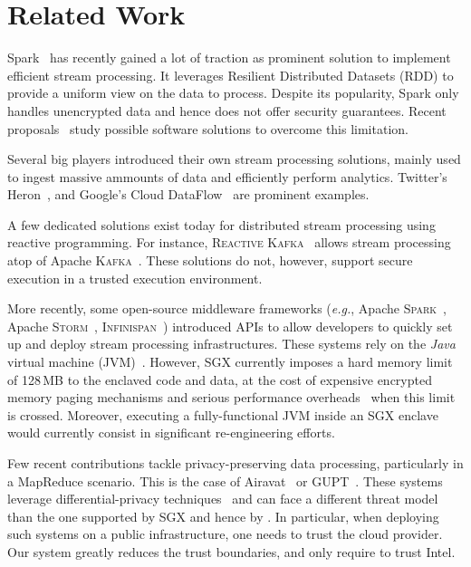 \section{Related Work}\label{sec:rw}


Spark~\cite{Zaharia:2013:DSF:2517349.2522737} has recently gained a lot of traction as prominent solution to implement efficient stream processing. 
It leverages Resilient Distributed Datasets (RDD) to provide a uniform view on the data to process.
Despite its popularity, Spark only handles unencrypted data and hence does not offer security guarantees. 
Recent proposals~\cite{7840754} study possible software solutions to overcome this limitation. 

Several big players introduced their own stream processing solutions, mainly used to ingest massive ammounts of data and efficiently perform analytics. 
Twitter's Heron~\cite{Kulkarni:2015:THS:2723372.2742788}, and Google's Cloud DataFlow~\cite{Akidau:2015:DMP:2824032.2824076} are prominent examples.

A few dedicated solutions exist today for distributed stream processing using reactive programming.
For instance, \textsc{Reactive Kafka}~\cite{reactivekafka} allows stream processing atop of Apache \textsc{Kafka}~\cite{apachekafka}.
These solutions do not, however, support secure execution in a trusted execution environment.

More recently, some open-source middleware frameworks (\emph{e.g.}, Apache \textsc{Spark}~\cite{apachesparkstreaming}, Apache \textsc{Storm}~\cite{apachestorm}, \textsc{Infinispan}~\cite{infinispan}) introduced APIs to allow developers to quickly set up and deploy stream processing infrastructures.
These systems rely on the \emph{Java} virtual machine (JVM)~\cite{lindholm2014java}.
However, SGX currently imposes a hard memory limit of 128\,MB to the enclaved code and data, at the cost of expensive encrypted memory paging mechanisms and serious performance overheads~\cite{pires_scbr:2016,brenner_securekeeper:_2016} when this limit is crossed.
Moreover, executing a fully-functional JVM inside an SGX enclave would currently consist in significant re-engineering efforts.

Few recent contributions tackle privacy-preserving data processing, particularly in a MapReduce scenario.
This is the case of Airavat~\cite{Roy:2010:ASP:1855711.1855731} or GUPT~\cite{Mohan:2012:GPP:2213836.2213876}.
These systems leverage differential-privacy techniques~\cite{dwork2006calibrating} and can face a different threat model than the one supported by SGX and hence by \SYS.
In particular, when deploying such systems on a public infrastructure, one needs to trust the cloud provider. 
Our system greatly reduces the trust boundaries, and only require to trust Intel.

